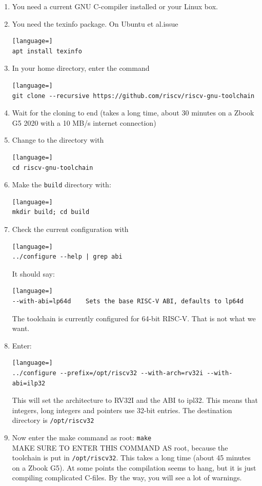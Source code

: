 \documentclass[12pt]{article}
\begin{document}
\begin{enumerate}
\item You need a current GNU C-compiler installed or your Linux box.
\item You need the texinfo package. On Ubuntu et al.\@ issue
\begin{lstlisting}[language=]
apt install texinfo
\end{lstlisting}
\item In your home directory, enter the command
\begin{lstlisting}[language=]
git clone --recursive https://github.com/riscv/riscv-gnu-toolchain
\end{lstlisting}
\item Wait for the cloning to end (takes a long time, about 30 minutes on a Zbook G5 2020 with a 10 MB/s internet connection)
\item Change to the directory with
\begin{lstlisting}[language=]
cd riscv-gnu-toolchain
\end{lstlisting}
\item Make the \texttt{build} directory with:
\begin{lstlisting}[language=]
mkdir build; cd build
\end{lstlisting}
\item Check the current configuration with
\begin{lstlisting}[language=]
../configure --help | grep abi
\end{lstlisting}
      It should say:
\begin{lstlisting}[language=]
--with-abi=lp64d    Sets the base RISC-V ABI, defaults to lp64d
\end{lstlisting}
The toolchain is currently configured for 64-bit RISC-V. That is not what we want.
\item Enter:
\begin{lstlisting}[language=]
../configure --prefix=/opt/riscv32 --with-arch=rv32i --with-abi=ilp32
\end{lstlisting}
This will set the architecture to RV32I and the ABI to ipl32. This means that integers, long integers and pointers use 32-bit entries. The destination directory is \lstinline|/opt/riscv32|
\item Now enter the make command as root: \lstinline|make|\\
MAKE SURE TO ENTER THIS COMMAND AS root, because the toolchain is put in \lstinline|/opt/riscv32|. This takes a long time (about 45 minutes on a Zbook G5). At some points the compilation seems to hang, but it is just compiling complicated C-files. By the way, you will see a lot of warnings.

\end{enumerate}
\end{document}
